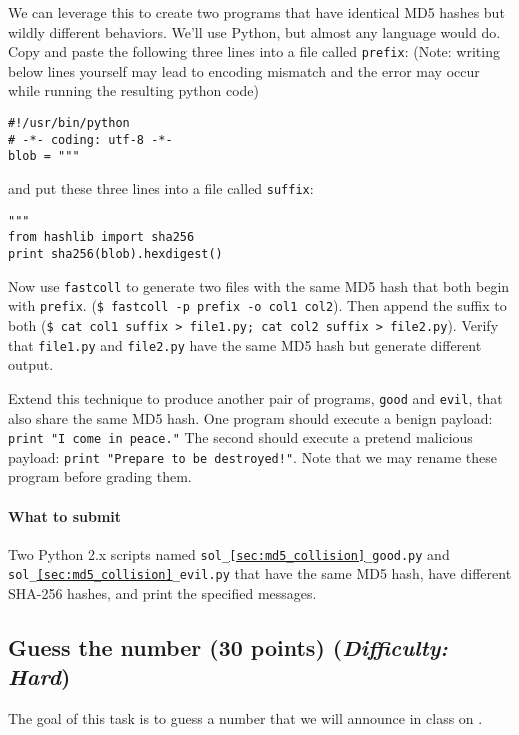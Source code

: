 \documentclass[letterpaper,12pt]{report}
\begin{document}
\medskip
 
We can leverage this to create two programs that have identical MD5 hashes but wildly different behaviors.  We'll use Python, but almost any language would do.  Copy and paste the following three lines into a file called \texttt{prefix}: (Note: writing below lines yourself may lead to encoding mismatch and the error may occur while running the resulting python code)

\begin{verbatim}
#!/usr/bin/python
# -*- coding: utf-8 -*-
blob = """
\end{verbatim}
 
and put these three lines into a file called \texttt{suffix}:
 
 \begin{verbatim}
"""
from hashlib import sha256
print sha256(blob).hexdigest()
\end{verbatim}
 
Now use \texttt{fastcoll} to generate two files with the same MD5 hash that both begin with \texttt{prefix}.  (\texttt{\$~fastcoll -p prefix -o col1 col2}).  Then append the suffix to both (\texttt{\$ cat col1 suffix > file1.py; cat col2 suffix > file2.py}).  Verify that \texttt{file1.py} and \texttt{file2.py} have the same MD5 hash but generate different output.
 
 \medskip

Extend this technique to produce another pair of programs, \texttt{good} and \texttt{evil}, that also share the same MD5 hash.  One program should execute a benign payload: \texttt{print "I come in peace."}  The second should execute a pretend malicious payload: \texttt{print "Prepare to be destroyed!"}. Note that we may rename these program before grading them.

\vspace{-6pt}
\paragraph{What to submit}
Two Python 2.x scripts named \texttt{sol\_\ref{sec:md5_collision}\_good.py} and \texttt{sol\_\ref{sec:md5_collision}\_evil.py} that have the same MD5 hash, have different SHA-256 hashes, and print the specified messages.

\subsection{Guess the number (30 points)  \hfill\rm\normalsize (\emph{Difficulty: Hard})}
\label{sec:md5_collision_application}
The goal of this task is to guess a number that we will announce in class on \duedate.  
\end{document}
